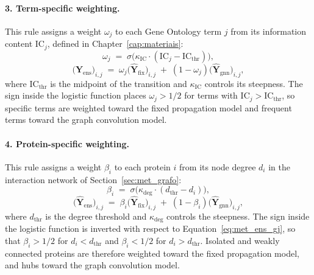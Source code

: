 \documentclass[Ingles]{ic-tese-v3}
\begin{document}
\paragraph{3. Term-specific weighting.} This rule assigns a weight $\omega_j$ to each Gene Ontology
term $j$ from its information content $\mathrm{IC}_j$, defined in Chapter~\ref{cap:materiais}:
\begin{equation}
  \omega_j \;=\; \sigma\!\bigl(\kappa_{\mathrm{IC}} \cdot (\mathrm{IC}_j - \mathrm{IC}_{\text{thr}})\bigr),
  \label{eq:met_ens_gj}
\end{equation}
\begin{equation}
  \bigl(\hat{\mathbf{Y}}_{\text{ens}}\bigr)_{i,j} \;=\;
  \omega_j \bigl(\hat{\mathbf{Y}}_{\text{fix}}\bigr)_{i,j}
  \;+\; (1 - \omega_j) \bigl(\hat{\mathbf{Y}}_{\text{gnn}}\bigr)_{i,j},
  \label{eq:met_ens_ic}
\end{equation}
\noindent where $\mathrm{IC}_{\text{thr}}$ is the midpoint of the transition and $\kappa_{\mathrm{IC}}$
controls its steepness. The sign inside the logistic function places $\omega_j > 1/2$ for terms with
$\mathrm{IC}_j > \mathrm{IC}_{\text{thr}}$, so specific terms are weighted toward the fixed
propagation model and frequent terms toward the graph convolution model.

\paragraph{4. Protein-specific weighting.} This rule assigns a weight $\beta_i$ to each protein $i$
from its node degree $d_i$ in the interaction network of Section~\ref{sec:met_grafo}:
\begin{equation}
  \beta_i \;=\; \sigma\!\bigl(\kappa_{\deg} \cdot (d_{\text{thr}} - d_i)\bigr),
  \label{eq:met_ens_beta}
\end{equation}
\begin{equation}
  \bigl(\hat{\mathbf{Y}}_{\text{ens}}\bigr)_{i,j} \;=\;
  \beta_i \bigl(\hat{\mathbf{Y}}_{\text{fix}}\bigr)_{i,j}
  \;+\; (1 - \beta_i) \bigl(\hat{\mathbf{Y}}_{\text{gnn}}\bigr)_{i,j},
  \label{eq:met_ens_degree}
\end{equation}
\noindent where $d_{\text{thr}}$ is the degree threshold and $\kappa_{\deg}$ controls the steepness. The sign
inside the logistic function is inverted with respect to Equation~\eqref{eq:met_ens_gj}, so that
$\beta_i > 1/2$ for $d_i < d_{\text{thr}}$ and $\beta_i < 1/2$ for $d_i > d_{\text{thr}}$. Isolated
and weakly connected proteins are therefore weighted toward the fixed propagation model, and hubs
toward the graph convolution model.
\end{document}
